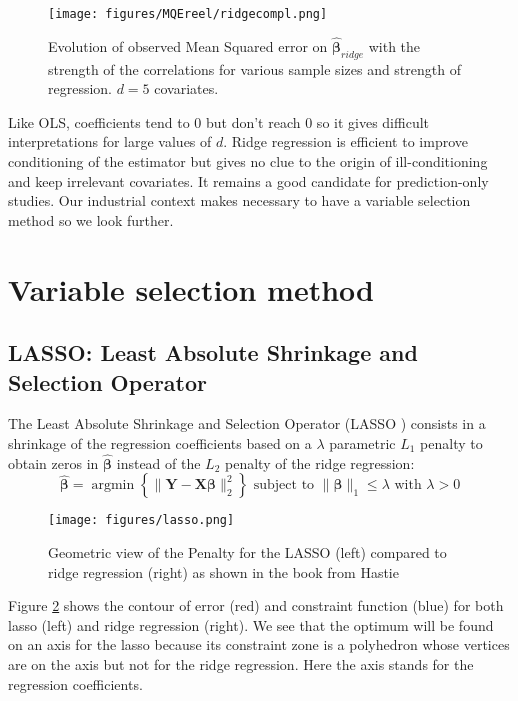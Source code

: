 \documentclass[12pt,a4paper]{report}
\begin{document}
	 \begin{figure}
	 \centering
	  \texttt{[image: figures/MQEreel/ridgecompl.png]}
	  \caption{Evolution of observed Mean Squared error on $\hat{\boldsymbol{\beta}}_{ridge}$ with the strength of the correlations for various sample sizes and strength of regression. $d=5$ covariates. } \label{MQEridgecompl}
	\end{figure}
	
	
	Like OLS, coefficients tend to 0 but don't reach 0 so it gives difficult interpretations for large values of $d$. Ridge regression is efficient to improve conditioning of the estimator but gives no clue to the origin of ill-conditioning and keep irrelevant covariates. It remains a good candidate for prediction-only studies. Our industrial context makes necessary to have a variable selection method so we look further.
	
		 \FloatBarrier
	\section{Variable selection method}
		\subsection{LASSO: Least Absolute Shrinkage and Selection Operator }		%

The Least Absolute Shrinkage and Selection Operator (\textsc{LASSO} \cite{tibshirani1996regression,tibshiranilasso}) consists in a shrinkage of the regression coefficients based on a $\lambda$ parametric $L_1$ penalty to obtain zeros in $\hat{\boldsymbol{\beta}}$ instead of the $L_2$ penalty of the ridge regression:
		\begin{equation}
		 \boldsymbol{\hat{\beta}}=\operatorname{argmin} \left\lbrace \parallel \boldsymbol{Y}-\boldsymbol{X\beta}\parallel_2^2 \right\rbrace \textrm{ subject to } \parallel\boldsymbol{\beta} \parallel_1\leq \lambda \textrm{ with } \lambda>0
		\end{equation}	
		
		\begin{figure}[h!]
			\centering
			\texttt{[image: figures/lasso.png]} 
			\caption{Geometric view of the Penalty for the LASSO (left) compared to ridge regression (right) as shown in the book from Hastie \cite{hastie2009elements}} \label{lassogeom}
		\end{figure}
		Figure \ref{lassogeom} shows the contour of error (red) and constraint function (blue) for both lasso (left) and ridge regression (right). We see that the optimum will be found on an axis for the lasso because its constraint zone is a polyhedron whose vertices are on the axis but not for the ridge regression. Here the axis stands for the regression coefficients.\\
		
\end{document}
